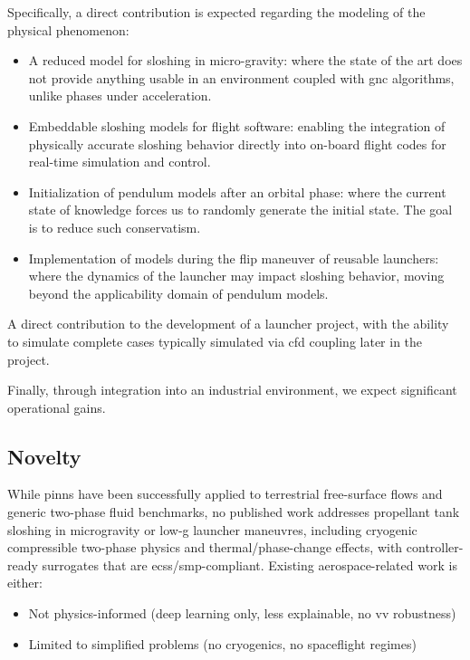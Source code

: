 \documentclass[12pt]{article}
\begin{document}
	Specifically, a direct contribution is expected regarding the modeling of the physical phenomenon:
	\begin{itemize}
		\item A reduced model for sloshing in micro-gravity: where the state of the art does not provide anything usable in an environment coupled with \acrshort{gnc} algorithms, unlike phases under acceleration.
		\item Embeddable sloshing models for flight software: enabling the integration of physically accurate sloshing behavior directly into on-board flight codes for real-time simulation and control.
		\item Initialization of pendulum models after an orbital phase: where the current state of knowledge forces us to randomly generate the initial state. The goal is to reduce such conservatism.
		\item Implementation of models during the flip maneuver of reusable launchers: where the dynamics of the launcher may impact sloshing behavior, moving beyond the applicability domain of pendulum models.
	\end{itemize}
	A direct contribution to the development of a launcher project, with the ability to simulate complete cases typically simulated via \acrshort{cfd} coupling later in the project.
	
	Finally, through integration into an industrial environment, we expect significant operational gains.
	
	\subsection*{Novelty}
	
	While \acrshort{pinns} have been successfully applied to terrestrial free-surface flows and generic two-phase fluid benchmarks, no published work addresses propellant tank sloshing in microgravity or low-g launcher maneuvres, including cryogenic compressible two-phase physics and thermal/phase-change effects, with controller-ready surrogates that are \acrshort{ecss}/\acrshort{smp}-compliant.
	Existing aerospace-related work is either:
	
	\begin{itemize}
		\item Not physics-informed (deep learning only, less explainable, no \acrshort{vv} robustness)
		\item Limited to simplified problems (no cryogenics, no spaceflight regimes)
	\end{itemize}
	
\end{document}
